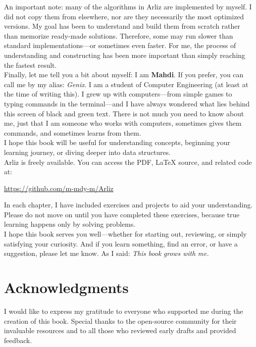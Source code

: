 \documentclass[12pt, oneside, openany]{book}
\begin{document}
	An important note: many of the algorithms in Arliz are implemented by myself. I did not copy them from elsewhere, nor are they necessarily the most optimized versions. My goal has been to understand and build them from scratch rather than memorize ready-made solutions. Therefore, some may run slower than standard implementations—or sometimes even faster. For me, the process of understanding and constructing has been more important than simply reaching the fastest result.\\	
	Finally, let me tell you a bit about myself:  
	I am \textbf{Mahdi}. If you prefer, you can call me by my alias: \emph{Genix}. I am a student of Computer Engineering (at least at the time of writing this). I grew up with computers—from simple games to typing commands in the terminal—and I have always wondered what lies behind this screen of black and green text. There is not much you need to know about me, just that I am someone who works with computers, sometimes gives them commands, and sometimes learns from them.\\	
	I hope this book will be useful for understanding concepts, beginning your learning journey, or diving deeper into data structures. \\	
	Arliz is freely available. You can access the PDF, LaTeX source, and related code at:  
	\begin{center}
		\url{https://github.com/m-mdy-m/Arliz}
	\end{center}
	In each chapter, I have included exercises and projects to aid your understanding. Please do not move on until you have completed these exercises, because true learning happens only by solving problems.\\	
	I hope this book serves you well—whether for starting out, reviewing, or simply satisfying your curiosity. And if you learn something, find an error, or have a suggestion, please let me know. As I said:
	\emph{This book grows with me.}
	
	\chapter{Acknowledgments}
		I would like to express my gratitude to everyone who supported me during the creation of this book. Special thanks to the open-source community for their invaluable resources and to all those who reviewed early drafts and provided feedback.
		
	\tableofcontents
	\renewcommand{\arraystretch}{1.5} %
\mainmatter
\end{document}

